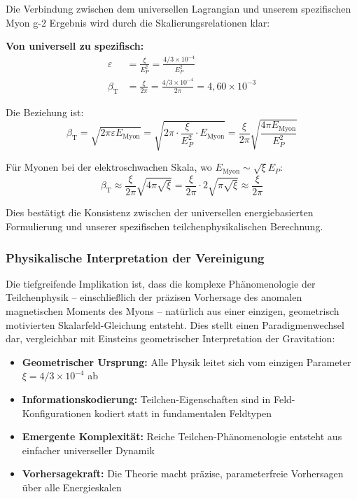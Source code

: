 \documentclass[12pt,a4paper]{article}
\newcommand{\betaT}{\beta_{\text{T}}}
\newcommand{\xipar}{\xi}
\begin{document}
	Die Verbindung zwischen dem universellen Lagrangian und unserem spezifischen Myon g-2 Ergebnis wird durch die Skalierungsrelationen klar:
	
	\textbf{Von universell zu spezifisch:}
	\begin{align}
		\varepsilon &= \frac{\xipar}{E_P^2} = \frac{4/3 \times 10^{-4}}{E_P^2} \\
		\betaT &= \frac{\xipar}{2\pi} = \frac{4/3 \times 10^{-4}}{2\pi} = 4{,}60 \times 10^{-3}
	\end{align}
	
	Die Beziehung ist:
	\begin{equation}
		\betaT = \sqrt{2\pi \varepsilon E_{\text{Myon}}} = \sqrt{2\pi \cdot \frac{\xipar}{E_P^2} \cdot E_{\text{Myon}}} = \frac{\xipar}{2\pi} \sqrt{\frac{4\pi E_{\text{Myon}}}{E_P^2}}
	\end{equation}
	
	Für Myonen bei der elektroschwachen Skala, wo $E_{\text{Myon}} \sim \sqrt{\xipar} E_P$:
	\begin{equation}
		\betaT \approx \frac{\xipar}{2\pi} \sqrt{4\pi\sqrt{\xipar}} = \frac{\xipar}{2\pi} \cdot 2\sqrt{\pi\sqrt{\xipar}} \approx \frac{\xipar}{2\pi}
	\end{equation}
	
	Dies bestätigt die Konsistenz zwischen der universellen energiebasierten Formulierung und unserer spezifischen teilchenphysikalischen Berechnung.
	
	\subsubsection{Physikalische Interpretation der Vereinigung}
	
	Die tiefgreifende Implikation ist, dass die komplexe Phänomenologie der Teilchenphysik -- einschließlich der präzisen Vorhersage des anomalen magnetischen Moments des Myons -- natürlich aus einer einzigen, geometrisch motivierten Skalarfeld-Gleichung entsteht. Dies stellt einen Paradigmenwechsel dar, vergleichbar mit Einsteins geometrischer Interpretation der Gravitation:
	
	\begin{itemize}
		\item \textbf{Geometrischer Ursprung:} Alle Physik leitet sich vom einzigen Parameter $\xipar = 4/3 \times 10^{-4}$ ab
		\item \textbf{Informationskodierung:} Teilchen-Eigenschaften sind in Feld-Konfigurationen kodiert statt in fundamentalen Feldtypen
		\item \textbf{Emergente Komplexität:} Reiche Teilchen-Phänomenologie entsteht aus einfacher universeller Dynamik
		\item \textbf{Vorhersagekraft:} Die Theorie macht präzise, parameterfreie Vorhersagen über alle Energieskalen
	\end{itemize}
	
\end{document}
